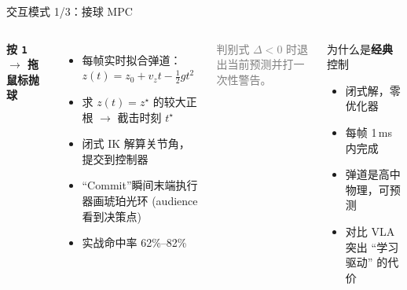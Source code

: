 \documentclass[aspectratio=169, 11pt]{beamer}
\begin{document}
\begin{frame}{交互模式 1/3：接球 MPC}
\begin{columns}[T]
\textbf{按 \texttt{1} $\to$ 拖鼠标抛球}
\vspace{4pt}
\begin{itemize}\footnotesize
  \item 每帧实时拟合弹道：$z(t) = z_0 + v_z t - \tfrac{1}{2}g t^2$
  \item 求 $z(t) = z^\star$ 的较大正根 $\to$ 截击时刻 $t^\star$
  \item 闭式 IK 解算关节角，提交到控制器
  \item ``Commit''瞬间末端执行器画琥珀光环 (audience 看到决策点)
  \item 实战命中率 62\%--82\%
\end{itemize}
\vspace{4pt}
\textcolor{gray}{\scriptsize 判别式 $\Delta < 0$ 时退出当前预测并打一次性警告。}

\begin{block}{为什么是\textbf{经典}控制}
\begin{itemize}\footnotesize
\item 闭式解，零优化器
\item 每帧 1\,ms 内完成
\item 弹道是高中物理，可预测
\item 对比 VLA 突出 ``学习驱动'' 的代价
\end{itemize}
\end{block}
\end{columns}
\end{frame}
\end{document}
